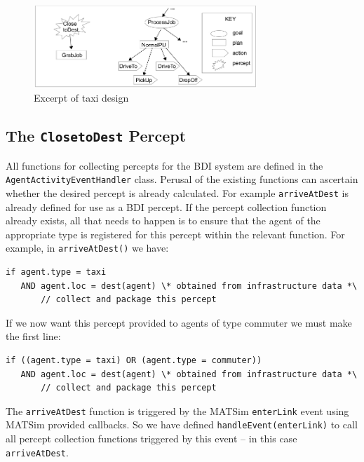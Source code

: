 \begin{figure}
\begin{center}
\includegraphics[width=0.75\textwidth]{extending/figures/bdi/fig-taxi-gptree.jpg}
\caption{Excerpt of taxi design}
\label{taxigptree}
\end{center}
\end{figure}

\subsection{The \texttt{ClosetoDest} Percept}
All functions for collecting percepts for the BDI system are defined
in the \texttt{AgentActivityEventHandler} class. Perusal of the existing
functions can ascertain whether the desired percept is already
calculated. For example \texttt{arriveAtDest} is already defined for use as a
BDI percept. 
%
If the percept collection function already exists, all that needs to
happen is to ensure that the agent of the appropriate type is
registered for this percept within the relevant function.
For example, in \texttt{arriveAtDest()} we have:
\begin{verbatim}
if agent.type = taxi
   AND agent.loc = dest(agent) \* obtained from infrastructure data *\
       // collect and package this percept
\end{verbatim}
If we now want this percept provided to agents of type commuter we
must make the first line:
\begin{verbatim}
if ((agent.type = taxi) OR (agent.type = commuter))
   AND agent.loc = dest(agent) \* obtained from infrastructure data *\
       // collect and package this percept
\end{verbatim}

The \texttt{arriveAtDest} function is triggered by the MATSim
\texttt{enterLink} event using MATSim provided callbacks. So
we have defined \texttt{handleEvent(enterLink)} to call all percept
  collection functions triggered by this event -- in this case
  \texttt{arriveAtDest}. 

